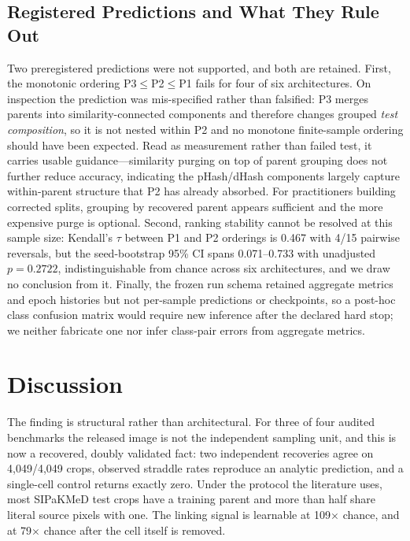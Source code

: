\documentclass[conference]{IEEEtran}
\newcommand{\protocol}[1]{\textsf{#1}}
\begin{document}
\subsection{Registered Predictions and What They Rule Out}
Two preregistered predictions were not supported, and both are retained.
First, the monotonic ordering \protocol{P3}$\leq$\protocol{P2}$\leq$\protocol{P1} fails for four of six architectures.
On inspection the prediction was mis-specified rather than falsified: \protocol{P3} merges parents into similarity-connected components and therefore changes grouped \emph{test composition}, so it is not nested within \protocol{P2} and no monotone finite-sample ordering should have been expected.
Read as measurement rather than failed test, it carries usable guidance---similarity purging on top of parent grouping does not further reduce accuracy, indicating the pHash/dHash components largely capture within-parent structure that \protocol{P2} has already absorbed.
For practitioners building corrected splits, grouping by recovered parent appears sufficient and the more expensive purge is optional.
Second, ranking stability cannot be resolved at this sample size: Kendall's $\tau$ between \protocol{P1} and \protocol{P2} orderings is 0.467 with 4/15 pairwise reversals, but the seed-bootstrap 95\% CI spans 0.071--0.733 with unadjusted $p=0.2722$, indistinguishable from chance across six architectures, and we draw no conclusion from it.
Finally, the frozen run schema retained aggregate metrics and epoch histories but not per-sample predictions or checkpoints, so a post-hoc class confusion matrix would require new inference after the declared hard stop; we neither fabricate one nor infer class-pair errors from aggregate metrics.

\section{Discussion}
The finding is structural rather than architectural.
For three of four audited benchmarks the released image is not the independent sampling unit, and this is now a recovered, doubly validated fact: two independent recoveries agree on 4,049/4,049 crops, observed straddle rates reproduce an analytic prediction, and a single-cell control returns exactly zero.
Under the protocol the literature uses, most SIPaKMeD test crops have a training parent and more than half share literal source pixels with one.
The linking signal is learnable at 109$\times$ chance, and at 79$\times$ chance after the cell itself is removed.
\end{document}
